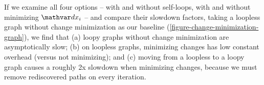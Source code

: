 \nopagebreak[3]
\begin{center}
  \small\sffamily
\end{center}




\noindent
If we examine all four options -- with and without self-loops, with and without minimizing $\dx_i$ -- and compare their slowdown factors, taking a loopless graph without change minimization as our baseline (\cref{figure-change-minimization-graph}), we find that (a) loopy graphs without change minimization are asymptotically slow; (b) on loopless graphs, minimizing changes has low constant overhead (versus not minimizing); and (c) moving from a loopless to a loopy graph causes a roughly 2x slowdown when minimizing changes, because we must remove rediscovered paths on every iteration.

